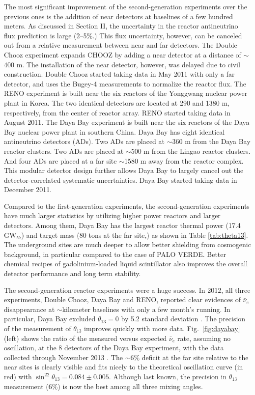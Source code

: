 The most significant improvement of the second-generation experiments over the previous ones is the addition of near detectors at baselines of a few hundred meters. As discussed in Section II, the uncertainty in the reactor antineutrino flux prediction is large (2--5\%.) This flux uncertainty, however, can be canceled out from a relative measurement between near and far detectors. The Double Chooz experiment expands CHOOZ by adding a near detector at a distance of $\sim$400 m. The installation of the near detector, however, was delayed due to civil construction. Double Chooz started taking data in May 2011 with only a far detector, and uses the Bugey-4 measurements to normalize the reactor flux. The RENO experiment is built near the six reactors of the Yonggwang nuclear power plant in Korea. The two identical detectors are located at 290 and 1380 m, respectively, from the center of reactor array. RENO started taking data in August 2011. The Daya Bay experiment is built near the six reactors of the Daya Bay nuclear power plant in southern China. Daya Bay has eight identical antineutrino detectors (ADs). Two ADs are placed at $\sim$360 m from the Daya Bay reactor clusters. Two ADs are placed at $\sim$500 m from the Lingao reactor clusters. And four ADs are placed at a far site $\sim$1580 m away from the reactor complex. This modular detector design further allows Daya Bay to largely cancel out the detector-correlated systematic uncertainties. Daya Bay started taking data in December 2011.

Compared to the first-generation experiments, the second-generation experiments have much larger statistics by utilizing higher power reactors and larger detectors. Among them, Daya Bay has the largest reactor thermal power (17.4 GW$_{th}$) and target mass (80 tons at the far site,) as shown in Table \ref{tab:theta13}. The underground sites are much deeper to allow better shielding from cosmogenic background, in particular compared to the case of PALO VERDE. Better chemical recipes of gadolinium-loaded liquid scintillator also improves the overall detector performance and long term stability.

The second-generation reactor experiments were a huge success. In 2012, all three experiments, Double Chooz, Daya Bay and RENO, reported clear evidences of $\bar\nu_{e}$ disappearance \cite{DChooz,Reno,Dayabay} at $\sim$kilometer baselines with only a few month's running. In particular, Daya Bay excluded $\theta_{13}=0$ by 5.2 standard deviation \cite{Dayabay}. The precision of the measurement of $\theta_{13}$ improves quickly with more data.   Fig.~\ref{fig:dayabay} (left) shows the ratio of the measured versus expected $\bar\nu_{e}$ rate, assuming no oscillation, at the 8 detectors of the Daya Bay experiment, with the data collected through November 2013 \cite{Zhang-Neutrino14}. The $\sim$6\% deficit at the far site relative to the near sites is clearly visible and fits nicely to the theoretical oscillation curve (in red) with $\sin^22\theta_{13} = 0.084 \pm 0.005$. Although last known, the precision in $\theta_{13}$ measurement (6\%) is now the best among all three mixing angles.

